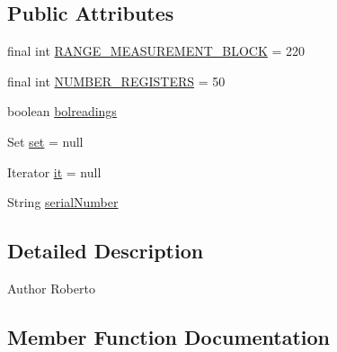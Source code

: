 \subsection*{Public Attributes}
\begin{DoxyCompactItemize}
\item 
final int \hyperlink{classcom_1_1eneri_1_1scorpio__metertool_1_1devices_1_1_readings_a2fdaeedd566c037e37fd30df9c6b9cde}{R\+A\+N\+G\+E\+\_\+\+M\+E\+A\+S\+U\+R\+E\+M\+E\+N\+T\+\_\+\+B\+L\+O\+CK} = 220
\item 
final int \hyperlink{classcom_1_1eneri_1_1scorpio__metertool_1_1devices_1_1_readings_a260a70ee7820bfe6c4aa594b2f466ae2}{N\+U\+M\+B\+E\+R\+\_\+\+R\+E\+G\+I\+S\+T\+E\+RS} = 50
\item 
boolean \hyperlink{classcom_1_1eneri_1_1scorpio__metertool_1_1devices_1_1_readings_a752ee032f1fb0b002a7a01bd7d4cb05e}{bolreadings}
\item 
Set \hyperlink{classcom_1_1eneri_1_1scorpio__metertool_1_1devices_1_1_readings_a592c9ffb4730818a5003e4897f1996c7}{set} = null
\item 
Iterator \hyperlink{classcom_1_1eneri_1_1scorpio__metertool_1_1devices_1_1_readings_ad419d514d55b98f7b6c8618f22654994}{it} = null
\item 
String \hyperlink{classcom_1_1eneri_1_1scorpio__metertool_1_1devices_1_1_readings_ae20849d78dbee9e3d2bb5df3c1657bff}{serial\+Number}
\end{DoxyCompactItemize}


\subsection{Detailed Description}
\begin{DoxyAuthor}{Author}
Roberto 
\end{DoxyAuthor}


\subsection{Member Function Documentation}
\mbox{\label{classcom_1_1eneri_1_1scorpio__metertool_1_1devices_1_1_readings_a802faea37a618e66652c077455657cca}} 
